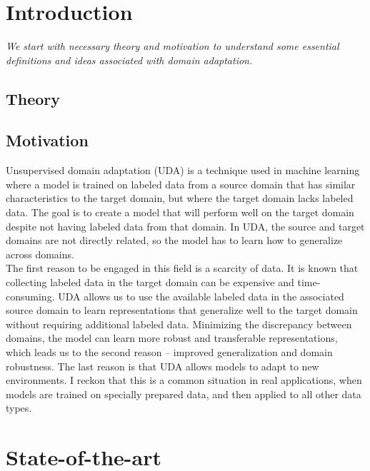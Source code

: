 \section{Introduction} \label{section: introduction}

\emph{We start with necessary theory and motivation to understand some essential definitions and ideas associated with domain adaptation.}\\

\subsection{Theory}


\subsection{Motivation}

Unsupervised domain adaptation (UDA) is a technique used in machine learning where a model is trained on labeled data from a source domain that has similar characteristics to the target domain, but where the target domain lacks labeled data. The goal is to create a model that will perform well on the target domain despite not having labeled data from that domain. In UDA, the source and target domains are not directly related, so the model has to learn how to generalize across domains.\\

The first reason to be engaged in this field is a scarcity of data. It is known that collecting labeled data in the target domain can be expensive and time-consuming. UDA allows us to use the available labeled data in the associated source domain to learn representations that generalize well to the target domain without requiring additional labeled data. Minimizing the discrepancy between domains, the model can learn more robust and transferable representations, which leads us to the second reason -- improved generalization and domain robustness. The last reason is that UDA allows models to adapt to new environments. I reckon that this is a common situation in real applications, when models are trained on specially prepared data, and then applied to all other data types.

\newpage

\section{State-of-the-art}

